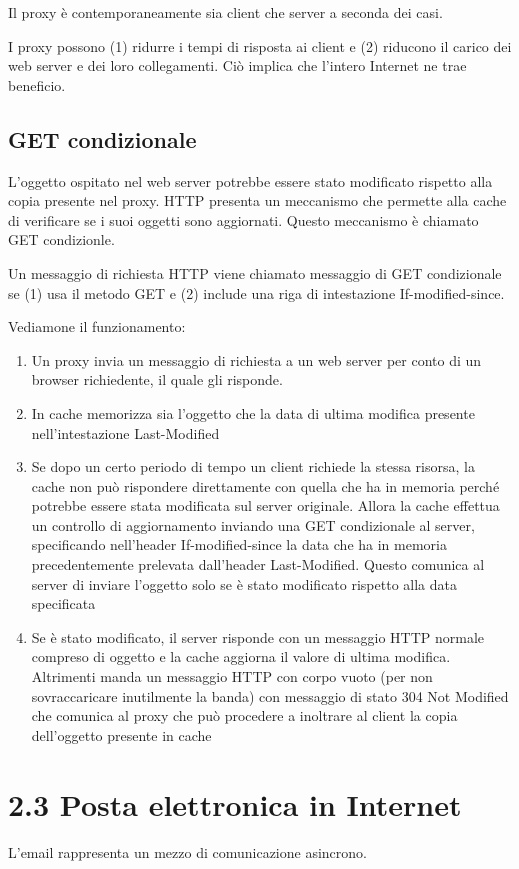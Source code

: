\documentclass{book}
\begin{document}
Il proxy è contemporaneamente sia client che server a seconda dei casi.

I proxy possono (1) ridurre i tempi di risposta ai client e (2) riducono il carico dei web server e dei loro collegamenti. Ciò implica che l'intero Internet ne trae beneficio.

\subsection*{GET condizionale}
L'oggetto ospitato nel web server potrebbe essere stato modificato rispetto alla copia presente nel proxy. HTTP presenta un meccanismo che permette alla cache di verificare se i suoi oggetti sono aggiornati. Questo meccanismo è chiamato GET condizionle.

Un messaggio di richiesta HTTP viene chiamato messaggio di GET condizionale se (1) usa il metodo GET e (2) include una riga di intestazione If-modified-since.

Vediamone il funzionamento:
\begin{enumerate}
	\item Un proxy invia un messaggio di richiesta a un web server per conto di un browser richiedente, il quale gli risponde.
	\item In cache memorizza sia l'oggetto che la data di ultima modifica presente nell'intestazione Last-Modified
	\item Se dopo un certo periodo di tempo un client richiede la stessa risorsa, la cache non può rispondere direttamente con quella che ha in memoria perché potrebbe essere stata modificata sul server originale. Allora la cache effettua un controllo di aggiornamento inviando una GET condizionale al server, specificando nell'header If-modified-since la data che ha in memoria precedentemente prelevata dall'header Last-Modified. Questo comunica al server di inviare l'oggetto solo se è stato modificato rispetto alla data specificata
	\item Se è stato modificato, il server risponde con un messaggio HTTP normale compreso di oggetto e la cache aggiorna il valore di ultima modifica. Altrimenti manda un messaggio HTTP con corpo vuoto (per non sovraccaricare inutilmente la banda) con messaggio di stato 304 Not Modified che comunica al proxy che può procedere a inoltrare al client la copia dell'oggetto presente in cache
\end{enumerate}

\section*{2.3 Posta elettronica in Internet}
L'email rappresenta un mezzo di comunicazione asincrono.
\end{document}
